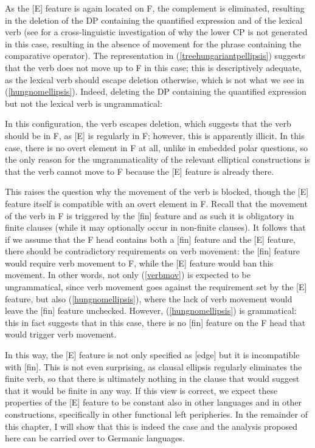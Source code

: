 As the [E] feature is again located on F, the complement is eliminated, resulting in the deletion of the DP containing the quantified expression and of the lexical verb (see \citealt{bacskaiatkari2016alh} for a cross-linguistic investigation of why the lower CP is not generated in this case, resulting in the absence of movement for the phrase containing the comparative operator). The representation in (\ref{treehungariantpellipsis}) suggests that the verb does not move up to F in this case; this is descriptively adequate, as the lexical verb should escape deletion otherwise, which is not what we see in (\ref{hungnomellipsis}). Indeed, deleting the DP containing the quantified expression but not the lexical verb is ungrammatical:

\z

In this configuration, the verb escapes deletion, which suggests that the verb should be in F, as [E] is regularly in F; however, this is apparently illicit. In this case, there is no overt element in F at all, unlike in embedded polar questions, so the only reason for the ungrammaticality of the relevant elliptical constructions is that the verb cannot move to F because the [E] feature is already there.

This raises the question why the movement of the verb is blocked, though the [E] feature itself is compatible with an overt element in F. Recall that the movement of the verb in F is triggered by the [fin] feature and as such it is obligatory in finite clauses (while it may optionally occur in non-finite clauses). It follows that if we assume that the F head contains both a [fin] feature and the [E] feature, there should be contradictory requirements on verb movement: the [fin] feature would require verb movement to F, while the [E] feature would ban this movement. In other words, not only (\ref{verbmov}) is expected to be ungrammatical, since verb movement goes against the requirement set by the [E] feature, but also (\ref{hungnomellipsis}), where the lack of verb movement would leave the [fin] feature unchecked. However, (\ref{hungnomellipsis}) is grammatical: this in fact suggests that in this case, there is no [fin] feature on the F head that would trigger verb movement.

In this way, the [E] feature is not only specified as [edge] but it is incompatible with [fin]. This is not even surprising, as clausal ellipsis regularly eliminates the finite verb, so that there is ultimately nothing in the clause that would suggest that it would be finite in any way. If this view is correct, we expect these properties of the [E] feature to be constant also in other languages and in other constructions, specifically in other functional left peripheries. In the remainder of this chapter, I will show that this is indeed the case and the analysis proposed here can be carried over to Germanic languages.

